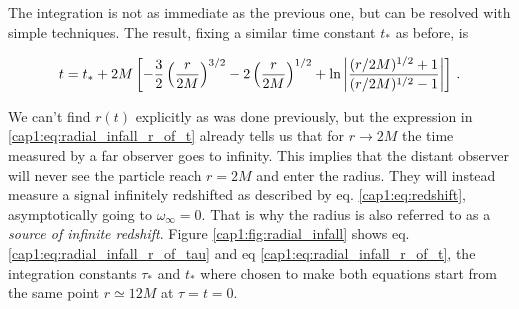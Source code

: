 The integration is not as immediate as the previous one, but can be resolved
with simple techniques.
The result, fixing a similar time constant $t_*$ as before, is

\begin{equation}
    t = t_* + 2M \left[ -\frac{3}{2} \left(\frac{r}{2M}\right)^{3/2}
    - 2 \left(\frac{r}{2M}\right)^{1/2}
    + \ln \abs{\frac{(r/2M)^{1/2} + 1}{(r/2M)^{1/2} - 1}} \right] \, .
    \label{cap1:eq:radial_infall_r_of_t}
\end{equation}

We can't find $r(t)$ explicitly as was done previously, but the expression in
\ref{cap1:eq:radial_infall_r_of_t} already tells us that for
$r \rightarrow 2M$ the time measured by a far observer goes to infinity.
This implies that the distant observer will never see the particle reach
$r = 2M$ and enter the \Sh radius.
They will instead measure a signal infinitely redshifted as described by eq.
\ref{cap1:eq:redshift}, asymptotically going to $\omega_\infty = 0$.
That is why the \Sh radius is also referred to as a
\textit{source of infinite redshift}.
Figure \ref{cap1:fig:radial_infall} shows eq.
\ref{cap1:eq:radial_infall_r_of_tau} and eq
\ref{cap1:eq:radial_infall_r_of_t}, the integration constants $\tau_*$ and
$t_*$ where chosen to make both equations start from the same point
$r \simeq 12M$ at $\tau = t =  0$.

